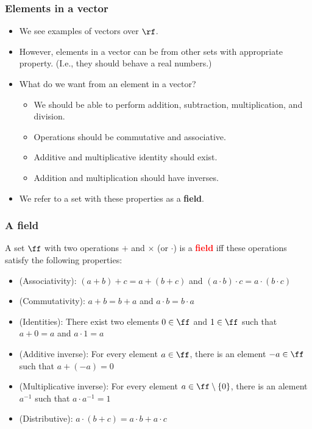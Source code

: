 
\begin{frame}
  \frametitle{Elements in a vector}
  \begin{itemize}
  \item We see examples of vectors over $\rf$.
  \item However, elements in a vector can be from other sets with
    appropriate property.  (I.e., they should behave a real numbers.)
  \item What do we want from an element in a vector?
    \pause
    \begin{itemize}
    \item We should be able to perform addition, subtraction, multiplication, and division.
      \pause
    \item Operations should be commutative and associative.
    \item Additive and multiplicative identity should exist.
    \item Addition and multiplication should have inverses.
    \end{itemize}
    \pause

    \item We refer to a set with these properties as a {\bf field}.
  \end{itemize}
\end{frame}

\begin{frame}
  \frametitle{A field}

  A set $\ff$ with two operations $+$ and $\times$ (or $\cdot$) is a
  \textcolor{red}{\bf field} iff these operations satisfy the
  following properties:
  \begin{itemize}
    \pause
  \item (Associativity): $(a+b)+c = a+(b+c)$ and $(a\cdot b)\cdot c = a\cdot(b\cdot c)$
    \pause
  \item (Commutativity): $a+b=b+a$ and $a\cdot b=b\cdot a$
    \pause
  \item (Identities): There exist two elements $0\in\ff$ and $1\in\ff$ such that $a+0 = a$ and $a\cdot 1 = a$
    \pause
  \item (Additive inverse): For every element $a\in \ff$, there is an element $-a\in \ff$ such that $a+(-a) = 0$
    \pause
  \item (Multiplicative inverse): For every element $a\in \ff\setminus\{0\}$, there is an alement $a^{-1}$ such that $a\cdot a^{-1}=1$
    \pause
  \item (Distributive): $a\cdot(b+c)=a\cdot b + a\cdot c$
  \end{itemize}
\end{frame}

